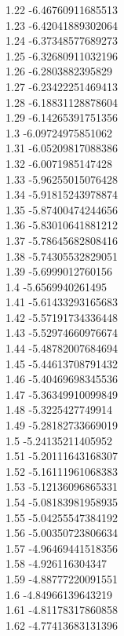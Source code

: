 {1.22	-6.46760911685513\\
1.23	-6.42041889302064\\
1.24	-6.37348577689273\\
1.25	-6.32680911032196\\
1.26	-6.2803882395829\\
1.27	-6.23422251469413\\
1.28	-6.18831128878604\\
1.29	-6.14265391751356\\
1.3	-6.09724975851062\\
1.31	-6.05209817088386\\
1.32	-6.0071985147428\\
1.33	-5.96255015076428\\
1.34	-5.91815243978874\\
1.35	-5.87400474244656\\
1.36	-5.83010641881212\\
1.37	-5.78645682808416\\
1.38	-5.74305532829051\\
1.39	-5.6999012760156\\
1.4	-5.6569940261495\\
1.41	-5.61433293165683\\
1.42	-5.57191734336448\\
1.43	-5.52974660976674\\
1.44	-5.48782007684694\\
1.45	-5.44613708791432\\
1.46	-5.40469698345536\\
1.47	-5.36349910099849\\
1.48	-5.3225427749914\\
1.49	-5.28182733669019\\
1.5	-5.24135211405952\\
1.51	-5.20111643168307\\
1.52	-5.16111961068383\\
1.53	-5.12136096865331\\
1.54	-5.08183981958935\\
1.55	-5.04255547384192\\
1.56	-5.00350723806634\\
1.57	-4.96469441518356\\
1.58	-4.926116304347\\
1.59	-4.88777220091551\\
1.6	-4.84966139643219\\
1.61	-4.81178317860858\\
1.62	-4.77413683131396\\
}
